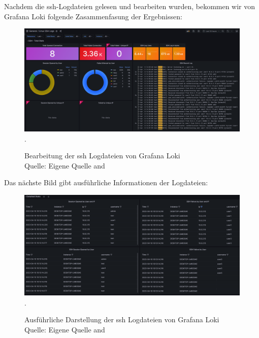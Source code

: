 \newpage
\thispagestyle{lscape}
\begin{landscape}
   Nachdem die \gls{ssh}-Logdateien gelesen und bearbeiten wurden, bekommen wir von Grafana Loki folgende Zasammenfasung der Ergebnissen:
   \begin{center}
      \begin{figure}[H]
         \centering
         \includegraphics[width=1.3\textwidth]{assets/GrafanaLoki_ssh.png}.
         \caption{Bearbeitung der \gls{ssh} Logdateien von Grafana Loki\\Quelle: Eigene Quelle and \citep{VoidQuark_sshlogs}}
         \centering
      \end{figure}
   \end{center}
\end{landscape}

\newpage
\thispagestyle{lscape}
\begin{landscape}
   Das nächste Bild gibt ausführliche Informationen der Logdateien:
   \begin{center}
      \begin{figure}[H]
         \centering
         \includegraphics[width=1.3\textwidth]{assets/GrafanaLoki_sshDetailed.png}.
         \caption{Ausführliche Darstellung der \gls{ssh} Logdateien von Grafana Loki\\Quelle: Eigene Quelle and \citep{VoidQuark_sshlogs}}
         \centering
      \end{figure}
   \end{center}
\end{landscape}

